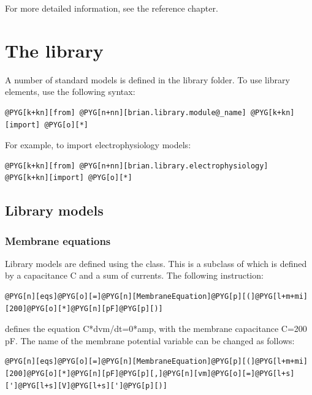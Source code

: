 \documentclass[letterpaper,10pt,english]{manual}
\begin{document}
For more detailed information, see the reference chapter.

\resetcurrentobjects
\hypertarget{--doc-library}{}

\chapter{The library}

A number of standard models is defined in the library folder. To use library elements, use the following syntax:

\begin{Verbatim}[commandchars=@\[\]]
@PYG[k+kn][from] @PYG[n+nn][brian.library.module@_name] @PYG[k+kn][import] @PYG[o][*]
\end{Verbatim}

For example, to import electrophysiology models:

\begin{Verbatim}[commandchars=@\[\]]
@PYG[k+kn][from] @PYG[n+nn][brian.library.electrophysiology] @PYG[k+kn][import] @PYG[o][*]
\end{Verbatim}

\resetcurrentobjects
\hypertarget{--doc-librarymodels}{}

\section{Library models}


\subsection{Membrane equations}

Library models are defined using the  class. This is a subclass of
\hyperlink{brian.Equations}{} which is defined by a capacitance C and a sum of currents. The following instruction:

\begin{Verbatim}[commandchars=@\[\]]
@PYG[n][eqs]@PYG[o][=]@PYG[n][MembraneEquation]@PYG[p][(]@PYG[l+m+mi][200]@PYG[o][*]@PYG[n][pF]@PYG[p][)]
\end{Verbatim}

defines the equation C*dvm/dt=0*amp, with the membrane capacitance C=200 pF. The name of the membrane potential
variable can be changed as follows:

\begin{Verbatim}[commandchars=@\[\]]
@PYG[n][eqs]@PYG[o][=]@PYG[n][MembraneEquation]@PYG[p][(]@PYG[l+m+mi][200]@PYG[o][*]@PYG[n][pF]@PYG[p][,]@PYG[n][vm]@PYG[o][=]@PYG[l+s][']@PYG[l+s][V]@PYG[l+s][']@PYG[p][)]
\end{Verbatim}
\end{document}
